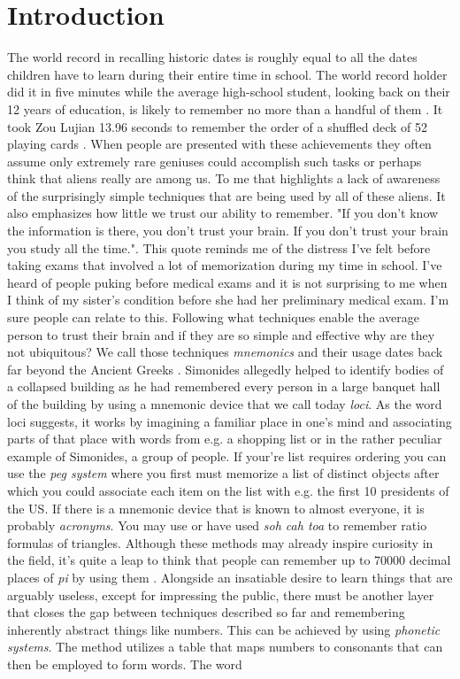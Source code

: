 \section{Introduction} \label{sec:body_motivation}

The world record in recalling historic dates is roughly equal to all the dates children have to learn during their entire time in school. The world record holder did it in five minutes while the average high-school student, looking back on their 12 years of education, is likely to remember no more than a handful of them \cite{how_to_become_a_memory_master}. It took Zou Lujian 13.96 seconds to remember the order of a shuffled deck of 52 playing cards \cite{record_recall_playing_cards}. When people are presented with these achievements they often assume only extremely rare geniuses could accomplish such tasks or perhaps think that aliens really are among us. To me that highlights a lack of awareness of the surprisingly simple techniques that are being used by all of these aliens. It also emphasizes how little we trust our ability to remember. "If you don't know the information is there, you don't trust your brain. If you don't trust your brain you study all the time."\cite{how_to_become_a_memory_master}. This quote reminds me of the distress I've felt before taking exams that involved a lot of memorization during my time in school. I've heard of people puking before medical exams and it is not surprising to me when I think of my sister's condition before she had her preliminary medical exam. I'm sure people can relate to this. Following what techniques enable the average person to trust their brain and if they are so simple and effective why are they not ubiquitous? We call those techniques \emph{mnemonics} and their usage dates back far beyond the Ancient Greeks \cite{white_2014}. Simonides allegedly helped to identify bodies of a collapsed building as he had remembered every person in a large banquet hall of the building by using a mnemonic device that we call today \emph{loci}. As the word loci suggests, it works by imagining a familiar place in one's mind and associating parts of that place with words from e.g. a shopping list or in the rather peculiar example of Simonides, a group of people. If your're list requires ordering you can use the \emph{peg system} where you first must memorize a list of distinct objects after which you could associate each item on the list with e.g. the first 10 presidents of the US. If there is a mnemonic device that is known to almost everyone, it is probably \emph{acronyms}. You may use or have used \emph{soh cah toa} to remember ratio formulas of triangles. Although these methods may already inspire curiosity in the field, it's quite a leap to think that people can remember up to 70000 decimal places of \emph{pi} by using them \cite{record_decimal_pi}. Alongside an insatiable desire to learn things that are arguably useless, except for impressing the public, there must be another layer that closes the gap between techniques described so far and remembering inherently abstract things like numbers. This can be achieved by using \emph{phonetic systems}. The method utilizes a table that maps numbers to consonants that can then be employed to form words. The word 